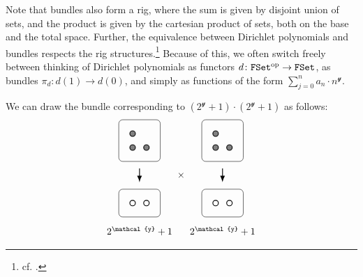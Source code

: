 \documentclass[11pt,fleqn]{article}
\newcommand{\yon}{\mathcal{y}}
\newcommand{\op}{^\textnormal{op}}
\newcommand{\cat}[1]{\mathtt{#1}}
\newcommand{\FSet}{\cat{FSet}}
\begin{document}
Note that bundles also form a rig, where the sum is given by disjoint union of sets, and the product is given by the cartesian product of sets, both on the base and the total space.
Further, the equivalence between Dirichlet polynomials and bundles respects the rig structures.\footnote{cf. \cite[Theorem~4.6]{SM2020}.}
Because of this, we often switch freely between thinking of Dirichlet polynomials as functors $d\colon\FSet\op\to\FSet$, as bundles $\pi_d\colon d(1)\to d(0)$, and simply as functions of the form $\sum_{j=0}^n a_n\cdot n^\yon$.

\begin{example}
  We can draw the bundle corresponding to $(2^\yon+1)\cdot(2^\yon+1)$ as follows:
  \[
    \begin{tikzpicture}[scale=0.5]
      \begin{scope}
        \begin{scope}
          \draw[rounded corners] (0,0) rectangle ++(3,3);
          \draw[thick,black,fill=gray] (1,1) circle (2mm);
          \draw[thick,black,fill=gray] (1,2) circle (2mm);
          \draw[thick,black,fill=gray] (2,1) circle (2mm);
        \end{scope}
        \draw[thick,-Latex] (1.5,-0.5) to (1.5,-1.5);
        \begin{scope}[shift={(0,-4)}]
          \draw[rounded corners] (0,0) rectangle ++(3,2);
          \draw[thick,black,fill=white] (1,1) circle (2mm);
          \draw[thick,black,fill=white] (2,1) circle (2mm);
        \end{scope}
        \node at (1.5,-5) {$2^\yon+1$};
      \end{scope}
      \node at (4.5,-1) {$\times$};
      \begin{scope}[shift={(6,0)}]
        \begin{scope}
          \draw[rounded corners] (0,0) rectangle ++(3,3);
          \draw[thick,black,fill=gray] (1,1) circle (2mm);
          \draw[thick,black,fill=gray] (1,2) circle (2mm);
          \draw[thick,black,fill=gray] (2,1) circle (2mm);
        \end{scope}
        \draw[thick,-Latex] (1.5,-0.5) to (1.5,-1.5);
        \begin{scope}[shift={(0,-4)}]
          \draw[rounded corners] (0,0) rectangle ++(3,2);
          \draw[thick,black,fill=white] (1,1) circle (2mm);
          \draw[thick,black,fill=white] (2,1) circle (2mm);
        \end{scope}
        \node at (1.5,-5) {$2^\yon+1$};
      \end{scope}

\end{tikzpicture}\]
\end{example}
\end{document}
